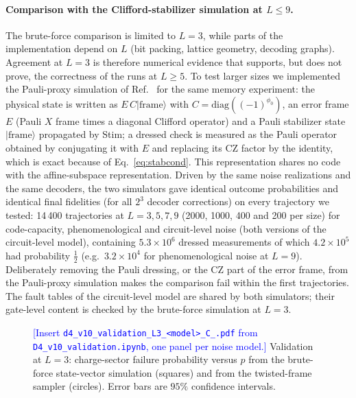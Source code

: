 \documentclass[a4paper]{article}
\newcommand{\blue}[1]{\textcolor{blue}{#1}}
\providecommand{\ket}[1]{\ensuremath{|#1\rangle}}
\begin{document}
\paragraph{Comparison with the Clifford-stabilizer simulation at $L\le9$.}
The brute-force comparison is limited to $L=3$, while parts of the implementation depend on $L$ (bit packing, lattice geometry, decoding graphs). Agreement at $L=3$ is therefore numerical evidence that supports, but does not prove, the correctness of the runs at $L\ge5$. To test larger sizes we implemented the Pauli-proxy simulation of Ref.~\cite{takada2026exact} for the same memory experiment: the physical state is written as $E\,C\ket{\mathrm{frame}}$ with $C=\mathrm{diag}((-1)^{\phi_0})$, an error frame $E$ (Pauli $X$ frame times a diagonal Clifford operator) and a Pauli stabilizer state $\ket{\mathrm{frame}}$ propagated by Stim; a dressed check is measured as the Pauli operator obtained by conjugating it with $E$ and replacing its CZ factor by the identity, which is exact because of Eq.~\eqref{eq:stabcond}. This representation shares no code with the affine-subspace representation. Driven by the same noise realizations and the same decoders, the two simulators gave identical outcome probabilities and identical final fidelities (for all $2^3$ decoder corrections) on every trajectory we tested: 14\,400 trajectories at $L=3,5,7,9$ (2000, 1000, 400 and 200 per size) for code-capacity, phenomenological and circuit-level noise (both versions of the circuit-level model), containing $5.3\times10^6$ dressed measurements of which $4.2\times10^5$ had probability $\tfrac12$ (e.g.\ $3.2\times10^4$ for phenomenological noise at $L=9$). Deliberately removing the Pauli dressing, or the CZ part of the error frame, from the Pauli-proxy simulation makes the comparison fail within the first trajectories. The fault tables of the circuit-level model are shared by both simulators; their gate-level content is checked by the brute-force simulation at $L=3$.

\begin{figure}[t]
  \centering
  \fbox{\rule{0pt}{50mm}\rule{0.82\linewidth}{0pt}}
  \caption{\blue{[Insert \texttt{d4\_v10\_validation\_L3\_<model>\_C\_<r|rgb>.pdf} from \texttt{D4\_v10\_validation.ipynb}, one panel per noise model.]} Validation at $L=3$: charge-sector failure probability versus $p$ from the brute-force state-vector simulation (squares) and from the twisted-frame sampler (circles). Error bars are $95\%$ confidence intervals.}
  \label{fig:validation}
\end{figure}
\end{document}
